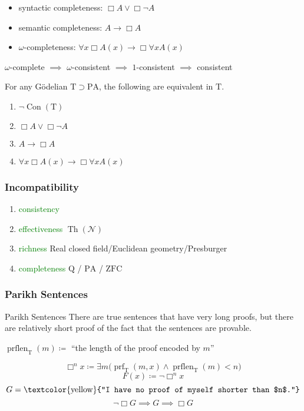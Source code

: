 \documentclass[UTF8,aspectratio=43,11pt,colorlinks,compress,openany]{beamer}%
\begin{document}
\begin{frame}\frametitle{}
	\begin{itemize}
		\item syntactic completeness: $\Box A\vee\Box \neg A$
		\item semantic completeness: $A\to\Box A$
		\item $\omega$-completeness: $\forall x\Box A(x)\to\Box \forall x A(x)$
	\end{itemize}
	\begin{center}
		$\omega$-complete $\implies$ $\omega$-consistent $\implies$ $1$-consistent $\implies$ consistent
	\end{center}
	\begin{theorem}
		For any G\"odelian $\mathrm{T}\supset \mathrm{PA} $, the following are equivalent in $\mathrm{T}$.
		\begin{enumerate}
			\item $\neg\operatorname{Con}(\mathrm{T})$
			\item $\Box A\vee\Box \neg A$
			\item $A\to\Box A$
			\item $\forall x\Box A(x)\to\Box \forall x A(x)$
		\end{enumerate}
	\end{theorem}
\end{frame}

\begin{frame}\frametitle{Incompatibility}
\begin{block}{}
			\begin{enumerate}
				\item \textcolor{green}{consistency}
				\item \textcolor{green}{effectiveness} $\operatorname{Th}(\mathcal{N})$
				\item \textcolor{green}{richness} Real closed field/Euclidean geometry/Presburger
				\item \textcolor{green}{completeness} $\mathrm{Q}$ / $\mathrm{PA}$ / $\mathrm{ZFC}$
			\end{enumerate}
\end{block}
\end{frame}

\begin{frame}\frametitle{Parikh Sentences}
	\begin{block}{Parikh Sentences}
		There are true sentences that have very long proofs, but there are relatively short proof of the fact that the sentences are provable.
		\begin{center}
			$\operatorname{prflen}_{\mathrm{T}}(m)\coloneqq $ ``the length of the proof encoded by $m$''
		\end{center}
		\[\Box ^n x\coloneqq \exists m\big(\operatorname{prf}_{\mathrm{T}}(m,x)\wedge\operatorname{prflen}_{\mathrm{T}}(m)<n\big)\]
		\[F(x)\coloneqq \neg\Box ^n x\]
		\[G=\text{\textcolor{yellow}{``I have no proof of myself shorter than $n$.''}}\]		
		\[\neg\Box G\implies G\implies\Box G\]
	\end{block}
\end{frame}
\end{document}
